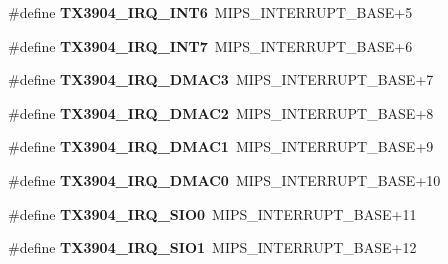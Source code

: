\begin{DoxyCompactItemize}
\item 
\mbox{\label{group__bsp__interrupt_gace25059e27f5cc07fdd14891dcf0eeee}} 
\#define {\bfseries T\+X3904\+\_\+\+I\+R\+Q\+\_\+\+I\+N\+T6}~M\+I\+P\+S\+\_\+\+I\+N\+T\+E\+R\+R\+U\+P\+T\+\_\+\+B\+A\+SE+5
\item 
\mbox{\label{group__bsp__interrupt_gaf132f051fb301131308514532216ccf9}} 
\#define {\bfseries T\+X3904\+\_\+\+I\+R\+Q\+\_\+\+I\+N\+T7}~M\+I\+P\+S\+\_\+\+I\+N\+T\+E\+R\+R\+U\+P\+T\+\_\+\+B\+A\+SE+6
\item 
\mbox{\label{group__bsp__interrupt_gab36e47cc2e673c078f4263e75ebd6608}} 
\#define {\bfseries T\+X3904\+\_\+\+I\+R\+Q\+\_\+\+D\+M\+A\+C3}~M\+I\+P\+S\+\_\+\+I\+N\+T\+E\+R\+R\+U\+P\+T\+\_\+\+B\+A\+SE+7
\item 
\mbox{\label{group__bsp__interrupt_ga28cc77aa6c7e56ac3369f1ccc151dad5}} 
\#define {\bfseries T\+X3904\+\_\+\+I\+R\+Q\+\_\+\+D\+M\+A\+C2}~M\+I\+P\+S\+\_\+\+I\+N\+T\+E\+R\+R\+U\+P\+T\+\_\+\+B\+A\+SE+8
\item 
\mbox{\label{group__bsp__interrupt_gafa412a9bd689af66e17035c9ebb8fb40}} 
\#define {\bfseries T\+X3904\+\_\+\+I\+R\+Q\+\_\+\+D\+M\+A\+C1}~M\+I\+P\+S\+\_\+\+I\+N\+T\+E\+R\+R\+U\+P\+T\+\_\+\+B\+A\+SE+9
\item 
\mbox{\label{group__bsp__interrupt_gabf76963282aa6da9f70cfa58254ea50b}} 
\#define {\bfseries T\+X3904\+\_\+\+I\+R\+Q\+\_\+\+D\+M\+A\+C0}~M\+I\+P\+S\+\_\+\+I\+N\+T\+E\+R\+R\+U\+P\+T\+\_\+\+B\+A\+SE+10
\item 
\mbox{\label{group__bsp__interrupt_ga2ebf34fad73490d33a5b32b1ea2e89ed}} 
\#define {\bfseries T\+X3904\+\_\+\+I\+R\+Q\+\_\+\+S\+I\+O0}~M\+I\+P\+S\+\_\+\+I\+N\+T\+E\+R\+R\+U\+P\+T\+\_\+\+B\+A\+SE+11
\item 
\mbox{\label{group__bsp__interrupt_gab05a7d1de9021921e9f610f891930481}} 
\#define {\bfseries T\+X3904\+\_\+\+I\+R\+Q\+\_\+\+S\+I\+O1}~M\+I\+P\+S\+\_\+\+I\+N\+T\+E\+R\+R\+U\+P\+T\+\_\+\+B\+A\+SE+12
\item 
\mbox{\label{group__bsp__interrupt_ga5b403f576c3114720fd3ff5785c7f327}} 

\end{DoxyCompactItemize}
